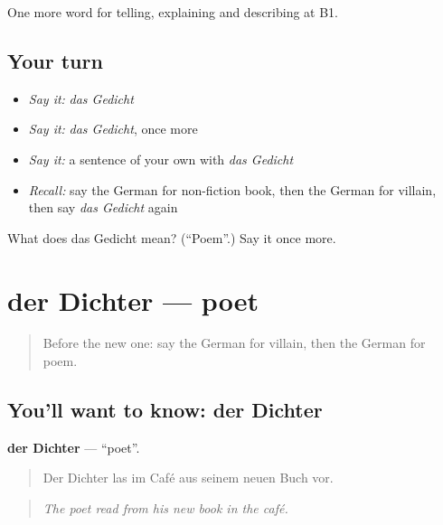\begin{grammarlens}[title={What you've built}]
One more word for telling, explaining and describing at B1.
\end{grammarlens}

\subsection*{Your turn}
\begin{itemize}
\raggedright
  \item \emph{Say it:} \emph{das Gedicht}
  \item \emph{Say it:} \emph{das Gedicht}, once more
  \item \emph{Say it:} a sentence of your own with \emph{das Gedicht}
  \item \emph{Recall:} say the German for non-fiction book, then the German for villain, then say \emph{das Gedicht} again
\end{itemize}

\begin{tcolorbox}[breakable,colback=teal!4,colframe=teal!35!black,title={Before you move on}]
What does das Gedicht mean? (\textquotedblleft{}Poem\textquotedblright{}.) Say it once more.
\end{tcolorbox}
\section[der Dichter]{der Dichter — poet}

\label{lesson:GE-C521-dichter}



\begin{quote}
Before the new one: say the German for villain, then the German for poem.
\end{quote}

\subsection*{You'll want to know: der Dichter}
\textbf{der Dichter} — \textquotedblleft{}poet\textquotedblright{}.

\begin{quote}
Der Dichter las im Café aus seinem neuen Buch vor.
\end{quote}

\begin{quote}
\emph{The poet read from his new book in the café.}
\end{quote}

